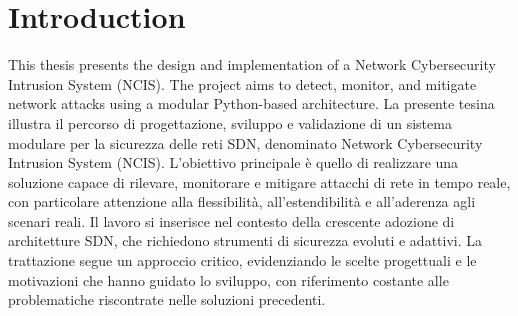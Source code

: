 \chapter{Introduction}
This thesis presents the design and implementation of a Network Cybersecurity Intrusion System (NCIS). The project aims to detect, monitor, and mitigate network attacks using a modular Python-based architecture.
La presente tesina illustra il percorso di progettazione, sviluppo e validazione di un sistema modulare per la sicurezza delle reti SDN, denominato Network Cybersecurity Intrusion System (NCIS). L’obiettivo principale è quello di realizzare una soluzione capace di rilevare, monitorare e mitigare attacchi di rete in tempo reale, con particolare attenzione alla flessibilità, all’estendibilità e all’aderenza agli scenari reali. Il lavoro si inserisce nel contesto della crescente adozione di architetture SDN, che richiedono strumenti di sicurezza evoluti e adattivi. La trattazione segue un approccio critico, evidenziando le scelte progettuali e le motivazioni che hanno guidato lo sviluppo, con riferimento costante alle problematiche riscontrate nelle soluzioni precedenti.
